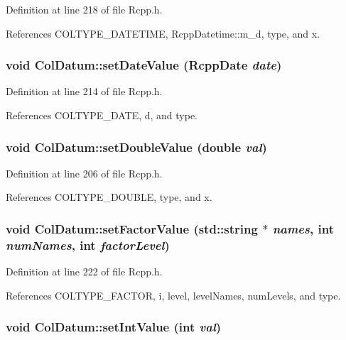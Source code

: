 Definition at line 218 of file Rcpp.h.

References COLTYPE\_\-DATETIME, RcppDatetime::m\_\-d, type, and x.\hypertarget{classColDatum_a988defa165f1d5ab7cde96d2c86c7c69}{
\subsubsection[{setDateValue}]{\setlength{\rightskip}{0pt plus 5cm}void ColDatum::setDateValue ({\bf RcppDate} {\em date})}}
\label{classColDatum_a988defa165f1d5ab7cde96d2c86c7c69}


Definition at line 214 of file Rcpp.h.

References COLTYPE\_\-DATE, d, and type.\hypertarget{classColDatum_aedf3ac3ea399222524f02f3468ec97a0}{
\subsubsection[{setDoubleValue}]{\setlength{\rightskip}{0pt plus 5cm}void ColDatum::setDoubleValue (double {\em val})}}
\label{classColDatum_aedf3ac3ea399222524f02f3468ec97a0}


Definition at line 206 of file Rcpp.h.

References COLTYPE\_\-DOUBLE, type, and x.\hypertarget{classColDatum_abd6f582044692c2215d9cd4add379ea1}{
\subsubsection[{setFactorValue}]{\setlength{\rightskip}{0pt plus 5cm}void ColDatum::setFactorValue (std::string $\ast$ {\em names}, \/  int {\em numNames}, \/  int {\em factorLevel})}}
\label{classColDatum_abd6f582044692c2215d9cd4add379ea1}


Definition at line 222 of file Rcpp.h.

References COLTYPE\_\-FACTOR, i, level, levelNames, numLevels, and type.\hypertarget{classColDatum_a80d401e1efb6e714113990c78e72eb84}{
\subsubsection[{setIntValue}]{\setlength{\rightskip}{0pt plus 5cm}void ColDatum::setIntValue (int {\em val})}}
\label{classColDatum_a80d401e1efb6e714113990c78e72eb84}


